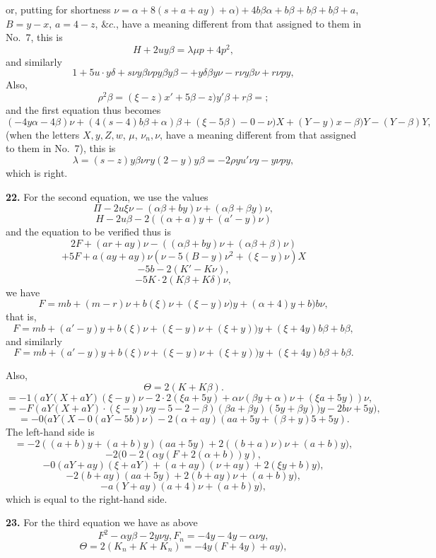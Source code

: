 \documentclass[11pt,a4paper]{book}
\begin{document}
or, putting for shortness $\nu = \alpha + 8(s + a + ay) + \alpha) + 4b\beta\alpha + b\beta + b\beta + b\beta + a$,
$B = y - x$, $a = 4 - z$, $\&c.$, have a meaning different from that assigned to them in No.\ 7, this is
\[
H + 2u y\beta = \lambda \mu p + 4p^2,
\]
and similarly
\[
1 + 5u \cdot y\delta + s\nu y\beta\nu p y\beta y\beta - + y\delta\beta y\nu - r\nu y\beta\nu + r\nu p y,
\]
Also,
\[
\rho^2 \beta = (\xi - z)x' + 5\beta - z) y'\beta + r\beta = ;
\]
and the first equation thus becomes
\[
(- 4y\alpha - 4\beta)\nu + (4(s - 4)b\beta + \alpha)\beta + (\xi - 5\beta) - 0 - \nu)X + (Y - y)x - \beta)Y - (Y - \beta)Y,
\]
(when the letters $X, y, Z, w$, $\mu$, $\nu_n, \nu$, have a meaning different from that assigned to them in No.\ 7), this is
\[
\lambda = (s - z) y\beta\nu r y(2 - y) y\beta = - 2\rho y u'\nu y - y\nu p y,
\]
which is right.

\textbf{22.} For the second equation, we use the values
\[
\Pi - 2u\xi\nu - (\alpha\beta + by)\nu + (\alpha\beta + \beta y)\nu,
\]
\[
H - 2u\beta - 2((\alpha + a) y + (a' - y)\nu)
\]
and the equation to be verified thus is
\[
2F + (a r + a y)\nu - ((\alpha\beta + by)\nu + (\alpha\beta + \beta)\nu)
\]
\[
+ 5F + a (a y + a y)\nu(\nu - 5(B - y)\nu^2 + (\xi - y)\nu)X
\]
\[
- 5b - 2(K' - K\nu),
\]
\[
- 5K \cdot 2(K\beta + K\delta)\nu,
\]
we have
\[
F = mb + (m - r)\nu + b(\xi)\nu + (\xi - y)\nu)y + (\alpha + 4)y + b)b\nu,
\]
that is,
\[
F = m b + (a' - y)y + b(\xi)\nu + (\xi - y)\nu + (\xi + y))y + (\xi + 4y)b\beta + b\beta,
\]
and similarly
\[
F = mb + (a' - y)y + b(\xi)\nu + (\xi - y)\nu + (\xi + y))y + (\xi + 4y)b\beta + b\beta.
\]

Also,
\[
\Theta = 2(K + K\beta).
\]
\[
= - 1(a Y(X + a Y)(\xi - y)\nu - 2 \cdot 2(\xi a + 5y) + \alpha\nu(\beta y + \alpha)\nu + (\xi a + 5y))\nu,
\]
\[
= - F(a Y(X + a Y) \cdot (\xi - y)\nu y - 5 - 2 - \beta)(\beta a + \beta y) (5y + \beta y))y - 2 b\nu + 5 y),
\]
\[
= - 0(a Y(X - 0(a Y - 5b)\nu) - 2(\alpha + a y)(a a + 5y + (\beta + y)5 + 5 y).
\]
The left-hand side is
\[
= - 2((a + b)y + (a + b)y)(a a + 5y) + 2((b + a)\nu)\nu + (a + b)y),
\]
\[
- 2(0 - 2(\alpha y(F + 2(\alpha + b))y),
\]
\[
- 0(a Y + a y)(\xi + a Y) + (a + a y)(\nu + a y) + 2(\xi y + b)y),
\]
\[
- 2(b + a y)(a a + 5y) + 2(b + a y)\nu + (a + b)y),
\]
\[
- a (Y + a y)(a + 4)\nu + (a + b)y),
\]
which is equal to the right-hand side.

\textbf{23.} For the third equation we have as above
\[
F^2 - \alpha y\beta - 2y\nu y, F_n = - 4y - 4y - \alpha\nu y,
\]
\[
\Theta = 2(K_n + K + K_n) = - 4y(F + 4y) + a y),
\]
\end{document}
